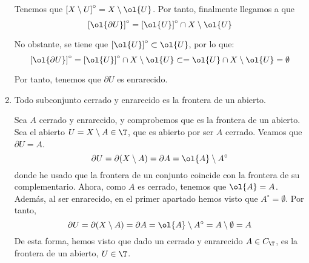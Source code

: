 \begin{ejercicio}
\begin{enumerate}
        Tenemos que $\left[X\setminus U\right]^\circ=X\setminus \ol{U}$. Por tanto, finalmente llegamos a que 
        $$\left[\ol{\partial U}\right]^\circ
            = \left[\ol{U}\right]^\circ\cap X\setminus\ol{U}
        $$

        No obstante, se tiene que $\left[\ol{U}\right]^\circ\subset \ol{U}$, por lo que:
        $$\left[\ol{\partial U}\right]^\circ
            = \left[\ol{U}\right]^\circ\cap X\setminus\ol{U}
            \subset 
            = \ol{U} \cap X\setminus\ol{U} = \emptyset
        $$

        Por tanto, tenemos que $\partial U$ es enrarecido.
        
        \item Todo subconjunto cerrado y enrarecido es la frontera de un abierto.

        Sea $A$ cerrado y enrarecido, y comprobemos que es la frontera de un abierto. Sea el abierto $U=X\setminus A\in \T$, que es abierto por ser $A$ cerrado. Veamos que $\partial U=A$.
        \begin{equation*}
            \partial U = \partial (X\setminus A) = \partial A = \ol{A}\setminus A^\circ
        \end{equation*}
        donde he usado que la frontera de un conjunto coincide con la frontera de su complementario. Ahora, como $A$ es cerrado, tenemos que $\ol{A}=A$. Además, al ser enrarecido, en el primer apartado hemos visto que $A^\circ = \emptyset$. Por tanto, 
        \begin{equation*}
            \partial U = \partial (X\setminus A) = \partial A = \ol{A}\setminus A^\circ = A\setminus \emptyset = A
        \end{equation*}
        De esta forma, hemos visto que dado un cerrado y enrarecido $A\in C_\T$, es la frontera de un abierto, $U\in \T$.
    \end{enumerate}
\end{ejercicio}

